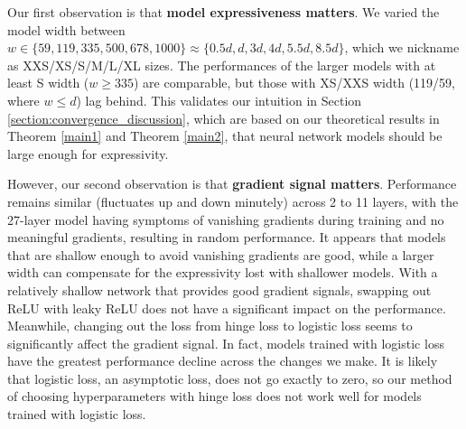\documentclass{article}
\begin{document}
Our first observation is that
\textbf{model expressiveness matters}.
We varied the model width between $w\in \{59,119,335,500,678,1000\}\approx \{0.5d, d, 3d, 4d, 5.5d, 8.5d\}$, which we nickname as XXS/XS/S/M/L/XL sizes.
The performances of the larger models with at least S width ($w\geq 335$) are comparable, but those with XS/XXS width (119/59, where $w\leq d$) lag behind.
This validates our intuition in Section \ref{section:convergence_discussion}, which are based on our theoretical results in Theorem \ref{main1} and Theorem \ref{main2}, that neural network models should be large enough for expressivity.

However, our second observation is that \textbf{gradient signal matters}.
Performance remains similar (fluctuates up and down minutely) across 2 to 11 layers, with the 27-layer model having symptoms of vanishing gradients during training and no meaningful gradients, resulting in random performance.
It appears that models that are shallow enough to avoid vanishing gradients are good, while a larger width can compensate for the expressivity lost with shallower models.
With a relatively shallow network that provides good gradient signals, swapping out ReLU with leaky ReLU does not have a significant impact on the performance.
Meanwhile, changing out the loss from hinge loss to logistic loss seems to significantly affect the gradient signal.
In fact, models trained with logistic loss have the greatest performance decline across the changes we make.
It is likely that logistic loss, an asymptotic loss, does not go exactly to zero, so our method of choosing hyperparameters with hinge loss does not work well for models trained with logistic loss.
\end{document}

